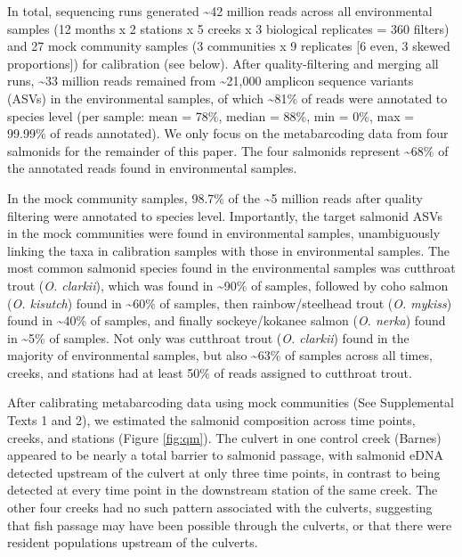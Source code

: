 \documentclass[
]{article}
\begin{document}
In total, sequencing runs generated \textasciitilde42 million reads
across all environmental samples (12 months x 2 stations x 5 creeks x 3
biological replicates = 360 filters) and 27 mock community samples (3
communities x 9 replicates {[}6 even, 3 skewed proportions{]}) for
calibration (see below). After quality-filtering and merging all runs,
\textasciitilde33 million reads remained from \textasciitilde21,000
amplicon sequence variants (ASVs) in the environmental samples, of which
\textasciitilde81\% of reads were annotated to species level (per
sample: mean = 78\%, median = 88\%, min = 0\%, max = 99.99\% of reads
annotated). We only focus on the metabarcoding data from four salmonids
for the remainder of this paper. The four salmonids represent
\textasciitilde68\% of the annotated reads found in environmental
samples.

In the mock community samples, 98.7\% of the \textasciitilde5 million
reads after quality filtering were annotated to species level.
Importantly, the target salmonid ASVs in the mock communities were found
in environmental samples, unambiguously linking the taxa in calibration
samples with those in environmental samples. The most common salmonid
species found in the environmental samples was cutthroat trout (\emph{O.
clarkii}), which was found in \textasciitilde90\% of samples, followed
by coho salmon (\emph{O. kisutch}) found in \textasciitilde60\% of
samples, then rainbow/steelhead trout (\emph{O. mykiss}) found in
\textasciitilde40\% of samples, and finally sockeye/kokanee salmon
(\emph{O. nerka}) found in \textasciitilde5\% of samples. Not only was
cutthroat trout (\emph{O. clarkii}) found in the majority of
environmental samples, but also \textasciitilde63\% of samples across
all times, creeks, and stations had at least 50\% of reads assigned to
cutthroat trout.

After calibrating metabarcoding data using mock communities (See
Supplemental Texts 1 and 2), we estimated the salmonid composition
across time points, creeks, and stations (Figure \ref{fig:qm}). The
culvert in one control creek (Barnes) appeared to be nearly a total
barrier to salmonid passage, with salmonid eDNA detected upstream of the
culvert at only three time points, in contrast to being detected at
every time point in the downstream station of the same creek. The other
four creeks had no such pattern associated with the culverts, suggesting
that fish passage may have been possible through the culverts, or that
there were resident populations upstream of the culverts.
\end{document}
